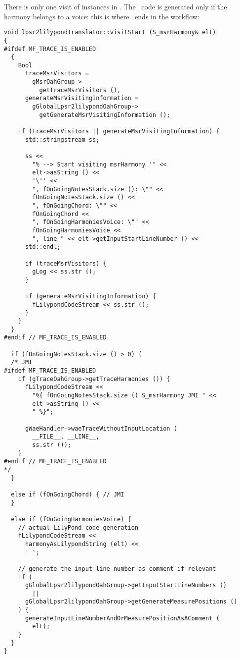 There is only one visit of  instances in . The \lily\ code is generated only if the harmony belongs to a voice: this is where \denorm\ ends in the workflow:%
\begin{lstlisting}[language=CPlusPlus]
void lpsr2lilypondTranslator::visitStart (S_msrHarmony& elt)
{
#ifdef MF_TRACE_IS_ENABLED
  {
    Bool
      traceMsrVisitors =
        gMsrOahGroup->
          getTraceMsrVisitors (),
      generateMsrVisitingInformation =
        gGlobalLpsr2lilypondOahGroup->
          getGenerateMsrVisitingInformation ();

    if (traceMsrVisitors || generateMsrVisitingInformation) {
      std::stringstream ss;

      ss <<
        "% --> Start visiting msrHarmony '" <<
        elt->asString () <<
        '\'' <<
        ", fOnGoingNotesStack.size (): \"" <<
        fOnGoingNotesStack.size () <<
        ", fOnGoingChord: \"" <<
        fOnGoingChord <<
        ", fOnGoingHarmoniesVoice: \"" <<
        fOnGoingHarmoniesVoice <<
        ", line " << elt->getInputStartLineNumber () <<
      std::endl;

      if (traceMsrVisitors) {
        gLog << ss.str ();
      }

      if (generateMsrVisitingInformation) {
        fLilypondCodeStream << ss.str ();
      }
    }
  }
#endif // MF_TRACE_IS_ENABLED

  if (fOnGoingNotesStack.size () > 0) {
  /* JMI
#ifdef MF_TRACE_IS_ENABLED
    if (gTraceOahGroup->getTraceHarmonies ()) {
      fLilypondCodeStream <<
        "%{ fOnGoingNotesStack.size () S_msrHarmony JMI " <<
        elt->asString () <<
        " %}";

      gWaeHandler->waeTraceWithoutInputLocation (
        __FILE__, __LINE__,
        ss.str ());
    }
#endif // MF_TRACE_IS_ENABLED
*/
  }

  else if (fOnGoingChord) { // JMI
  }

  else if (fOnGoingHarmoniesVoice) {
    // actual LilyPond code generation
    fLilypondCodeStream <<
      harmonyAsLilypondString (elt) <<
      ' ';

    // generate the input line number as comment if relevant
    if (
      gGlobalLpsr2lilypondOahGroup->getInputStartLineNumbers ()
        ||
      gGlobalLpsr2lilypondOahGroup->getGenerateMeasurePositions ()
    ) {
      generateInputLineNumberAndOrMeasurePositionAsAComment (
        elt);
    }
  }
}
\end{lstlisting}


